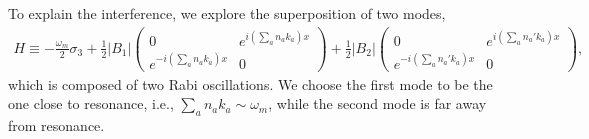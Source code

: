 \documentclass[letterpaper,12pt,english]{sphinxmanual}
\begin{document}
To explain the interference, we explore the superposition of two modes,
\begin{equation*}
\begin{split}H \equiv -\frac{\omega_m}{2} \sigma_3 + \frac{1}{2}
\lvert B_1 \rvert \begin{pmatrix}
0 & e^{i \left( \sum_{a} n_a k_a   \right)x} \\
e^{-i \left( \sum_{a} n_a k_a   \right)x} &  0
\end{pmatrix} + \frac{1}{2}
\lvert B_2 \rvert \begin{pmatrix}
0 & e^{i \left( \sum_{a} n_a' k_a   \right)x} \\
e^{-i \left( \sum_{a} n_a' k_a   \right)x} &  0
\end{pmatrix},\end{split}
\end{equation*}
which is composed of two Rabi oscillations. We choose the first mode to be the one close to resonance, i.e., \(\sum_a n_a k_a \sim \omega_m\), while the second mode is far away from resonance.
\end{document}
